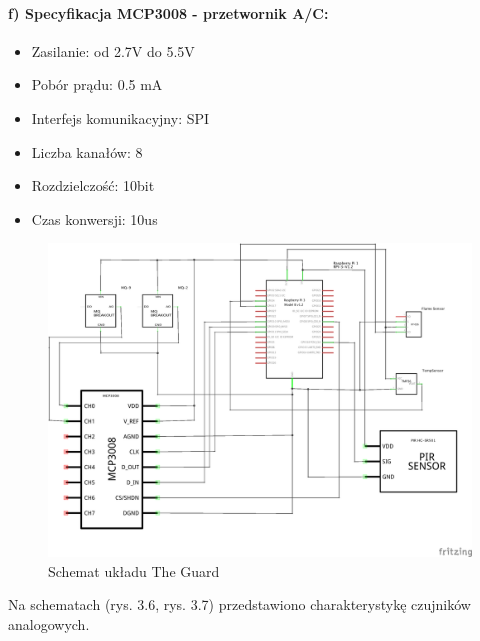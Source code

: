\paragraph{f) Specyfikacja MCP3008 - przetwornik A/C:}
\begin{itemize} 
\item Zasilanie: od 2.7V do 5.5V
\item Pobór prądu: 0.5 mA
\item Interfejs komunikacyjny: SPI
\item Liczba kanałów: 8
\item Rozdzielczość: 10bit
\item Czas konwersji: 10us
\end{itemize}
\begin{figure}[h]
	\centering
	\includegraphics[width=15cm]{GuardSchem}
	\caption{Schemat układu The Guard}
\end{figure}
Na schematach (rys. 3.6, rys. 3.7) przedstawiono charakterystykę czujników analogowych.
